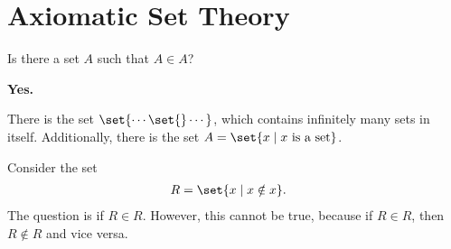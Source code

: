 \documentclass[10pt]{mypackage}
\begin{document}
\section{Axiomatic Set Theory}%
\begin{question}
  Is there a set $A$ such that $A\in A$?
\begin{answer}
  \textbf{Yes.}\newline

  There is the set $\set{\cdots\set{}\cdots}$, which contains infinitely many sets in itself. Additionally, there is the set $A = \set{x\mid x\text{ is a set}}$.
\end{answer}
\end{question}
\begin{example}
Consider the set
\begin{align*}
  R &= \set{x\mid x\notin x}.
\end{align*}
The question is if $R\in R$. However, this cannot be true, because if $R\in R$, then $R\notin R$ and vice versa.
\end{example}
\end{document}

